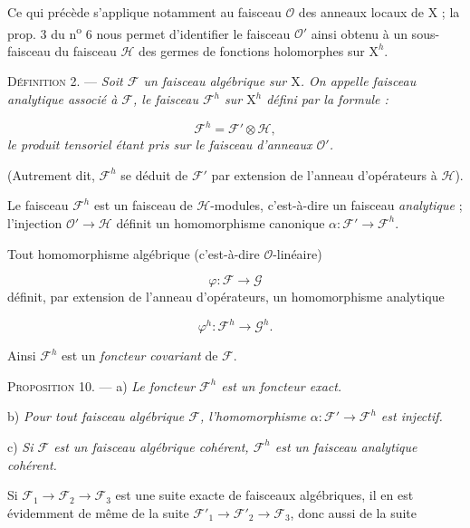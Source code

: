 Ce qui précède s'applique notamment au faisceau $\mathcal{O}$ des anneaux locaux de $\mathrm{X}$ ; la prop. 3 du n\textsuperscript{o} 6 nous permet d'identifier le faisceau $\mathcal{O}'$ ainsi obtenu à un sous-faisceau du faisceau $\mathcal{H}$ des germes de fonctions holomorphes sur $\mathrm{X}^h$.

\textsc{Définition} 2. --- \emph{Soit $\mathcal{F}$ un faisceau algébrique sur $\mathrm{X}$. On appelle faisceau analytique associé à $\mathcal{F}$, le faisceau $\mathcal{F}^h$ sur $\mathrm{X}^h$ défini par la formule :}

\begin{equation*}
\mathcal{F}^h = \mathcal{F}' \otimes \mathcal{H},
\end{equation*}
\emph{le produit tensoriel étant pris sur le faisceau d'anneaux $\mathcal{O}'$.}

(Autrement dit, $\mathcal{F}^h$ se déduit de $\mathcal{F}'$ par extension de l'anneau d'opérateurs à $\mathcal{H}$).

Le faisceau $\mathcal{F}^h$ est un faisceau de $\mathcal{H}$-modules, c'est-à-dire un faisceau \emph{analytique} ; l'injection $\mathcal{O}' \to \mathcal{H}$ définit un homomorphisme canonique $\alpha : \mathcal{F}' \to \mathcal{F}^h$.

Tout homomorphisme algébrique (c'est-à-dire $\mathcal{O}$-linéaire)

\begin{equation*}
\varphi : \mathcal{F} \to \mathcal{G}
\end{equation*}
définit, par extension de l'anneau d'opérateurs, un homomorphisme analytique

\begin{equation*}
\varphi^h : \mathcal{F}^h \to \mathcal{G}^h.
\end{equation*}


Ainsi $\mathcal{F}^h$ est un \emph{foncteur covariant} de $\mathcal{F}$.

\textsc{Proposition} 10. --- a) \emph{Le foncteur $\mathcal{F}^h$ est un foncteur exact.}

b) \emph{Pour tout faisceau algébrique $\mathcal{F}$, l'homomorphisme $\alpha : \mathcal{F}' \to \mathcal{F}^h$ est injectif.}

c) \emph{Si $\mathcal{F}$ est un faisceau algébrique cohérent, $\mathcal{F}^h$ est un faisceau analytique cohérent.}

Si $\mathcal{F}_1 \to \mathcal{F}_2 \to \mathcal{F}_3$ est une suite exacte de faisceaux algébriques, il en est évidemment de même de la suite $\mathcal{F}'_1 \to \mathcal{F}'_2 \to \mathcal{F}_3$, donc aussi de la suite

